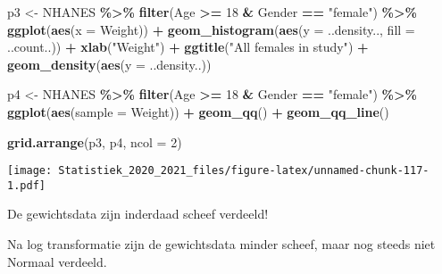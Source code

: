 \documentclass[
  12pt,dutch,coursenotes]{book}
\newenvironment{Shaded}{\begin{snugshade}}{\end{snugshade}}
\newcommand{\DataTypeTok}[1]{\textcolor[rgb]{0.13,0.29,0.53}{#1}}
\newcommand{\DecValTok}[1]{\textcolor[rgb]{0.00,0.00,0.81}{#1}}
\newcommand{\KeywordTok}[1]{\textcolor[rgb]{0.13,0.29,0.53}{\textbf{#1}}}
\newcommand{\NormalTok}[1]{#1}
\newcommand{\OperatorTok}[1]{\textcolor[rgb]{0.81,0.36,0.00}{\textbf{#1}}}
\newcommand{\StringTok}[1]{\textcolor[rgb]{0.31,0.60,0.02}{#1}}
\theoremstyle{definition}
\theoremstyle{definition}
\theoremstyle{definition}
\theoremstyle{remark}
\begin{document}
\begin{Shaded}
\begin{Highlighting}[]
\NormalTok{p3 \textless{}{-}}\StringTok{ }\NormalTok{NHANES }\OperatorTok{\%\textgreater{}\%}\StringTok{ }\KeywordTok{filter}\NormalTok{(Age }\OperatorTok{\textgreater{}=}\StringTok{ }\DecValTok{18} \OperatorTok{\&}\StringTok{ }\NormalTok{Gender }\OperatorTok{==}\StringTok{ "female"}\NormalTok{) }\OperatorTok{\%\textgreater{}\%}\StringTok{ }
\StringTok{    }\KeywordTok{ggplot}\NormalTok{(}\KeywordTok{aes}\NormalTok{(}\DataTypeTok{x =}\NormalTok{ Weight)) }\OperatorTok{+}\StringTok{ }\KeywordTok{geom\_histogram}\NormalTok{(}\KeywordTok{aes}\NormalTok{(}\DataTypeTok{y =}\NormalTok{ ..density.., }
    \DataTypeTok{fill =}\NormalTok{ ..count..)) }\OperatorTok{+}\StringTok{ }\KeywordTok{xlab}\NormalTok{(}\StringTok{"Weight"}\NormalTok{) }\OperatorTok{+}\StringTok{ }\KeywordTok{ggtitle}\NormalTok{(}\StringTok{"All females in study"}\NormalTok{) }\OperatorTok{+}\StringTok{ }
\StringTok{    }\KeywordTok{geom\_density}\NormalTok{(}\KeywordTok{aes}\NormalTok{(}\DataTypeTok{y =}\NormalTok{ ..density..))}

\NormalTok{p4 \textless{}{-}}\StringTok{ }\NormalTok{NHANES }\OperatorTok{\%\textgreater{}\%}\StringTok{ }\KeywordTok{filter}\NormalTok{(Age }\OperatorTok{\textgreater{}=}\StringTok{ }\DecValTok{18} \OperatorTok{\&}\StringTok{ }\NormalTok{Gender }\OperatorTok{==}\StringTok{ "female"}\NormalTok{) }\OperatorTok{\%\textgreater{}\%}\StringTok{ }
\StringTok{    }\KeywordTok{ggplot}\NormalTok{(}\KeywordTok{aes}\NormalTok{(}\DataTypeTok{sample =}\NormalTok{ Weight)) }\OperatorTok{+}\StringTok{ }\KeywordTok{geom\_qq}\NormalTok{() }\OperatorTok{+}\StringTok{ }\KeywordTok{geom\_qq\_line}\NormalTok{()}

\KeywordTok{grid.arrange}\NormalTok{(p3, p4, }\DataTypeTok{ncol =} \DecValTok{2}\NormalTok{)}
\end{Highlighting}
\end{Shaded}

\texttt{[image: Statistiek\_2020\_2021\_files/figure-latex/unnamed-chunk-117-1.pdf]}

De gewichtsdata zijn inderdaad scheef verdeeld!

Na log transformatie zijn de gewichtsdata minder scheef, maar nog steeds niet Normaal verdeeld.
\end{document}
